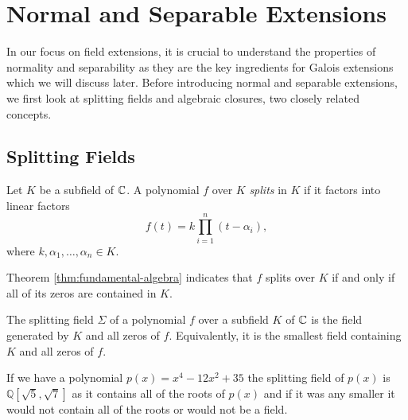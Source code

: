 \section{Normal and Separable Extensions}
In our focus on field extensions, it is crucial to understand the properties of normality and separability as they are the key ingredients for Galois extensions which we will discuss later. Before introducing normal and separable extensions, we first look at splitting fields and algebraic closures, two closely related concepts. 

\subsection{Splitting Fields}
\begin{definition}
    Let $K$ be a subfield of $\mathbb C$. A polynomial $f$ over $K$ \textit{splits} in $K$ if it factors into linear factors $$
    f(t) = k \prod _{i=1} ^n (t - \alpha_i),
    $$
    where $k, \alpha_1, \ldots, \alpha_n \in K$. 
\end{definition}
Theorem \ref{thm:fundamental-algebra} indicates that $f$ splits over $K$ if and only if all of its zeros are contained in $K$. 

\begin{definition}
    The splitting field $\Sigma$ of a polynomial $f$ over a subfield $K$ of $\mathbb C$ is the field generated by $K$ and all zeros of $f$. Equivalently, it is the smallest field containing $K$ and all zeros of $f$. 
\end{definition}

\begin{example}
If we have a polynomial \(p(x) = x^4 - 12x^2 + 35\) the splitting field of \(p(x)\) is \(\mathbb{Q}[\sqrt{5},\sqrt{7}]\) as it contains all of the roots of \(p(x)\) and if it was any smaller it would not contain all of the roots or would not be a field.
\end{example}

